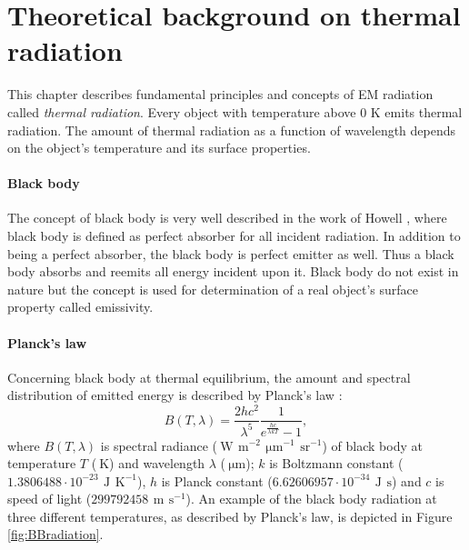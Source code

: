\chapter{Theoretical background on thermal radiation}
\label{chap:TheoreticalBackground}

This chapter describes fundamental principles and concepts of EM radiation called \textit{thermal radiation}. Every object with temperature above 0 K emits thermal radiation. The amount of thermal radiation as a function of wavelength depends on the object's temperature and its surface properties.

\subsubsection*{Black body}
The concept of black body is very well described in the work of Howell \cite{H11}, where black body is defined as perfect absorber for all incident radiation. In addition to being a perfect absorber, the black body is perfect emitter as well. Thus a black body absorbs and reemits all energy incident upon it. Black body do not exist in nature but the concept is used for determination of a real object's surface property called emissivity. 

\subsubsection*{Planck's law}
Concerning black body at thermal equilibrium, the amount and spectral distribution of emitted energy is described by Planck’s law \cite{P00}:
$$B(T,\lambda) = \frac{2hc^2}{\lambda^5}\frac{1}{e^{\frac{hc}{\lambda k T}}-1},$$
where $B(T,\lambda)$ is spectral radiance ($\SI{}{\watt}\,\SI{}{\meter}^{-2}\,\SI{}{\micro\meter}^{-1}\,\SI{}{\steradian}^{-1}$) of black body at temperature $T$ ($\SI{}{\kelvin}$) and wavelength $\lambda$ ($\SI{}{\micro\meter}$); $k$ is Boltzmann constant ($1.3806488\cdot10^{-23}\,\SI{}{\joule}\,\SI{}{\kelvin}^{-1}$), $h$ is Planck constant ($6.62606957\cdot10^{-34}\,\SI{}{\joule}\,\SI{}{\second}$) and $c$ is speed of light ($299792458\,\SI{}{\meter}\,\SI{}{\second}^{-1}$). An example of the black body radiation at three different temperatures, as described by Planck's law, is depicted in Figure \ref{fig:BBradiation}.

